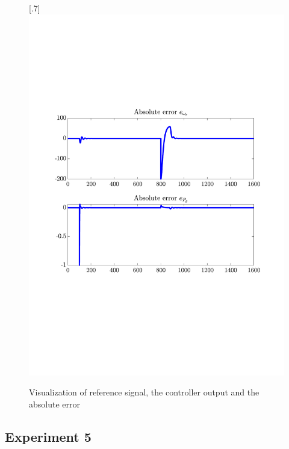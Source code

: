 \begin{figure}[H]
[.7\textwidth]{\includegraphics[width=1\linewidth, scale=1, trim=55 230 55 120,clip]{fig/Open_loop/exp_4_error.pdf}}
    \caption{Visualization of reference signal, the controller output and the absolute error}
    \label{fig:app:cl_results:exp4}
\end{figure}


\subsection{Experiment 5}

